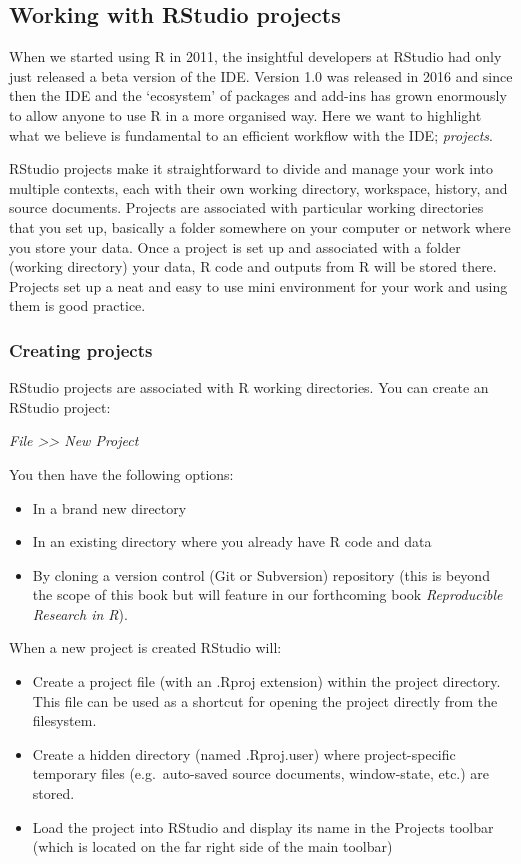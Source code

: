 \documentclass[
]{book}
\providecommand{\tightlist}{%
  \setlength{\itemsep}{0pt}\setlength{\parskip}{0pt}}
\begin{document}
\hypertarget{RS-projects}{%
\subsection{Working with RStudio projects}\label{RS-projects}}

When we started using R in 2011, the insightful developers at RStudio had only just released a beta version of the IDE. Version 1.0 was released in 2016 and since then the IDE and the `ecosystem' of packages and add-ins has grown enormously to allow anyone to use R in a more organised way. Here we want to highlight what we believe is fundamental to an efficient workflow with the IDE; \emph{projects}.

RStudio projects make it straightforward to divide and manage your work into multiple contexts, each with their own working directory, workspace, history, and source documents. Projects are associated with particular working directories that you set up, basically a folder somewhere on your computer or network where you store your data. Once a project is set up and associated with a folder (working directory) your data, R code and outputs from R will be stored there. Projects set up a neat and easy to use mini environment for your work and using them is good practice.

\hypertarget{create-proj}{%
\subsubsection{Creating projects}\label{create-proj}}

RStudio projects are associated with R working directories. You can create an RStudio project:

\emph{File \textgreater\textgreater{} New Project}

You then have the following options:

\begin{itemize}
\tightlist
\item
  In a brand new directory
\item
  In an existing directory where you already have R code and data
\item
  By cloning a version control (Git or Subversion) repository (this is beyond the scope of this book but will feature in our forthcoming book \emph{Reproducible Research in R}).
\end{itemize}

When a new project is created RStudio will:

\begin{itemize}
\tightlist
\item
  Create a project file (with an .Rproj extension) within the project directory. This file can be used as a shortcut for opening the project directly from the filesystem.
\item
  Create a hidden directory (named .Rproj.user) where project-specific temporary files (e.g.~auto-saved source documents, window-state, etc.) are stored.
\item
  Load the project into RStudio and display its name in the Projects toolbar (which is located on the far right side of the main toolbar)
\end{itemize}
\end{document}

